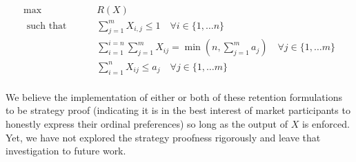 \begin{align}
\max \qquad & R(X) \\
\text{ such that } \qquad & \sum_{j=1}^m X_{i,j} \leq 1 \quad  \forall i \in \{1, \dots n\} \\
& \sum_{i = 1}^{i=n} \sum_{j = 1}^{m}X_{ij} = \min \left(n,\sum_{j = 1}^{m}a_j \right) \quad  \forall j \in \{1, \dots m\}  \\
& \sum_{i=1}^n X_{ij} \leq a_j \quad  \forall j \in \{1, \dots m\}  \\
\end{align} 

We believe the implementation of either or both of these retention formulations to be strategy proof (indicating it is in the best interest of market participants to honestly express their ordinal preferences) so long as the output of $X$ is enforced. Yet, we have not explored the strategy proofness rigorously and leave that investigation to future work.